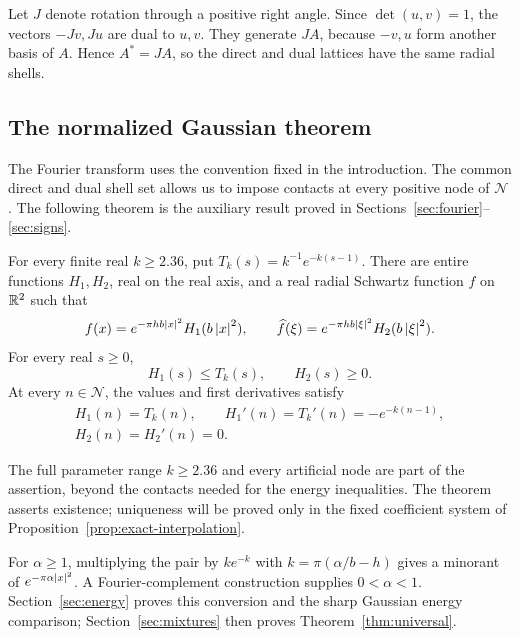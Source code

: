 Let \(J\) denote rotation through a positive right angle.  Since
\(\det(u,v)=1\), the vectors \(-Jv,Ju\) are dual to \(u,v\).  They generate
\(JA\), because \(-v,u\) form another basis of \(A\).  Hence \(A^*=JA\), so
the direct and dual lattices have the same radial shells.

\subsection{The normalized Gaussian theorem}

The Fourier transform uses the convention fixed in the introduction.
The common direct and dual shell set allows us to impose contacts at every
positive node of $\mathcal N$.  The following theorem is the auxiliary
result proved in Sections~\ref{sec:fourier}--\ref{sec:signs}.

\begin{theorem}\label{thm:normalized-pair}
For every finite real $k\ge2.36$, put $T_k(s)=k^{-1}e^{-k(s-1)}$.
There are entire functions $H_1,H_2$, real on the real axis, and a real radial
Schwartz function $f$ on $\mathbb R^2$ such that
\[
 f(x)=e^{-\pi h b\left\lvert x\right\rvert^2}H_1(b\left\lvert x\right\rvert^2),\qquad
 \widehat f(\xi)=e^{-\pi h b\left\lvert\xi\right\rvert^2}H_2(b\left\lvert\xi\right\rvert^2).
\]
For every real $s\ge0$,
\begin{equation}\label{eq:normalized-signs}
 H_1(s)\le T_k(s),\qquad H_2(s)\ge0.
\end{equation}
At every $n\in\mathcal N$, the values and first derivatives satisfy
\begin{equation}\label{eq:normalized-jets}
 \begin{gathered}
 H_1(n)=T_k(n),\qquad H_1'(n)=T_k'(n)=-e^{-k(n-1)},\\
 H_2(n)=H_2'(n)=0.
 \end{gathered}
\end{equation}
\end{theorem}

The full parameter range $k\ge2.36$ and every artificial node are part of
the assertion, beyond the contacts needed for the energy inequalities.
The theorem asserts existence; uniqueness will be proved only in the fixed
coefficient system of Proposition~\ref{prop:exact-interpolation}.

For $\alpha\ge1$, multiplying the pair by $ke^{-k}$ with
$k=\pi(\alpha/b-h)$ gives a minorant of $e^{-\pi\alpha\left\lvert x\right\rvert^2}$.
A Fourier-complement construction supplies $0<\alpha<1$.
Section~\ref{sec:energy} proves this conversion and the sharp Gaussian energy
comparison; Section~\ref{sec:mixtures} then proves
Theorem~\ref{thm:universal}.

